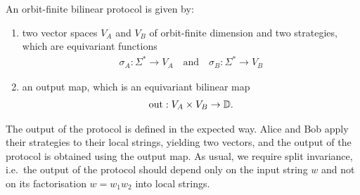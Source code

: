 \begin{theorem}



\begin{definition}
    \label{def:orbit-finite-scalar-product-protocol}
    An orbit-finite bilinear protocol is given by:
    \begin{enumerate}
        \item two vector spaces $V_A$ and $V_B$ of orbit-finite dimension  and two strategies, which are  equivariant functions
        \begin{align*}
        \sigma_A : \Sigma^* \to V_A 
        \quad \text{and} \quad
        \sigma_B : \Sigma^* \to V_B
        \end{align*}
        \item an output map, which is an equivariant bilinear map 
        \begin{align*}
        \text{out} : V_A \times V_B \to \mathbb D.
        \end{align*}
    \end{enumerate}
\end{definition}
The output of the protocol is defined in the expected way. Alice and Bob apply their strategies to their local strings, yielding two vectors, and the output of the protocol is obtained using the output map. As usual, we require split invariance, i.e.~the output of the protocol should depend only on the input string $w$ and not on its factorisation $w = w_1 w_2$ into local strings. 


\end{theorem}
